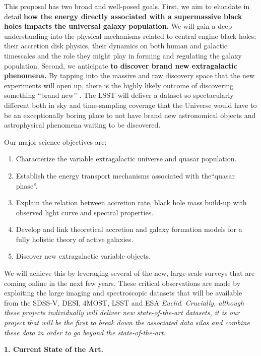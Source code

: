 \documentclass[oneside, a4paper, onecolumn, 11pt]{article}
\begin{document}
\smallskip
\smallskip
\noindent
This proposal has two broad and well-posed goals. First, we aim to elucidate in detail {\bf how the energy directly associated with a supermassive black holes impacts the universal galaxy population.} We will gain a deep understanding into the physical mechanisms related to central engine black holes; their accretion disk physics, their dynamics on both human and galactic timescales and the role they might play in forming and regulating the galaxy population. 
Second, we anticipate {\bf to discover brand new extragalactic phenomena.}  
By tapping into the massive and raw discovery space that the new experiments will open up, there is the highly likely outcome of discovering something ``brand new''  \citep{Ivezic2008, LSST_ScienceBook}. The LSST will deliver a dataset so spectacularly different both in sky and time-sampling coverage that the Universe would have to be an exceptionally boring place to not have brand new astronomical objects and astrophysical phenomena waiting to be discovered.

\smallskip
\smallskip
\noindent
Our major science objectives are:
\begin{enumerate}
\item Characterize the variable extragalactic universe and quasar population. 
\item Establish the energy transport mechanisms associated with the``quasar phase''. 
\item Explain the relation between accretion rate, black hole mass build-up with observed light curve and spectral properties. 
\item Develop and link theoretical accretion and galaxy formation models for a fully holistic theory of active galaxies. 
\item Discover new extragalactic variable objects. 
\end{enumerate}


\smallskip
\smallskip
\noindent
We will achieve this by leveraging several of the new, large-scale surveys that are coming online in the next few years. These critical observations are made by exploiting the large imaging and spectroscopic datasets that will be available from the SDSS-V, DESI, 4MOST, LSST and ESA {\it Euclid}. {\it Crucially, although these  projects individually will deliver new state-of-the-art datasets, it is our project that will be the first to break down the associated data  silos and combine these data in order to go beyond the state-of-the-art.}

\medskip
\medskip
\noindent
\large
{\bf{\textcolor{Cerulean}{1. Current State of the Art.}}}
\normalsize
\end{document}
